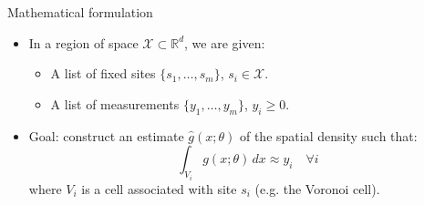 \documentclass[aspectratio=169]{beamer}
\begin{document}
\begin{frame}{Mathematical formulation}

	\begin{itemize}
		\item In a region of space $\mathcal{X}\subset \mathbb{R}^d$, we are given:
		\vspace{0.5cm}
		\begin{itemize}
			\item A list of \alert{fixed} sites $\{s_1,\ldots,s_m\}$, $s_i\in \mathcal{X}$.
			\vspace{0.5cm}

			\item A list of measurements $\{y_1,\ldots,y_m\}$, $y_i\geqslant 0$.
		\end{itemize}
\vfill
		\item \alert{Goal:} construct an estimate $\hat{g}(x;\theta)$ of the spatial density such that:
		\begin{equation*}
			\int_{V_i} g(x;\theta) \,dx \approx y_i \quad \forall i
		\end{equation*}
		where $V_i$ is a \alert{cell} associated with site $s_i$ (e.g. the Voronoi cell).
	\end{itemize}
\end{frame}
\end{document}
